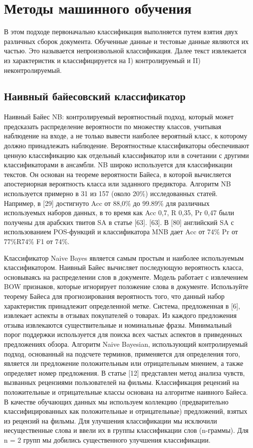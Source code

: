 \section{Методы машинного обучения}

В этом подходе первоначально классификация выполняется путем взятия двух
различных сборок документа. Обученные данные и тестовые данные являются их
частью. Это называется непроизвольной классификация. Далее текст извлекается из
характеристик и классифицируется на I) контролируемый и II) неконтролируемый.
\cite{article18}

\subsection{Наивный байесовский классификатор}

Наивный Байес NB: контролируемый вероятностный подход, который может предсказать
распределение вероятности по множеству классов, учитывая наблюдение на входе, а
не только вывести наиболее вероятный класс, к которому должно принадлежать
наблюдение. Вероятностные классификаторы обеспечивают ценную классификацию как
отдельный классификатор или в сочетании с другими классификаторами в ансамбли.
NB широко используется для классификации текстов. Он основан на теореме
вероятности Байеса, в которой вычисляется апостериорная вероятность класса или
заданного предиктора.  Алгоритм NB используется примерно в 31 из 157 (около
20\%) исследованных статей. Например, в [29] достигнуто Acc от 88,0\% до 99.89\%
для различных используемых наборов данных, в то время как Acc 0,7, R 0,35, Pr
0,47 были получены для арабских твитов SA в статье [63]. [63]. В [80] английский
SA с использованием POS-функций и классификатора MNB дает Acc от 74\% Pr от
77\%R74\% F1 от 74\%.~\cite{article2}

Классификатор Naive Bayes является самым простым и наиболее используемым
классификатором. Наивный Байес вычисляет последующую вероятность класса,
основываясь на распределении слов в документе. Модель работает с извлечением BOW
признаков, которые игнорирует положение слова в документе. Используйте теорему
Байеса для прогнозирования вероятность того, что данный набор характеристик
принадлежит определенной метке.
Система, предложенная в [6], извлекает аспекты в отзывах покупателей о товарах.
Из каждого предложения отзыва извлекаются существительные и номинальные фразы.
Минимальный порог поддержки используется для поиска всех частых аспектов в
приведенных предложениях обзора. Алгоритм Naive Bayesian, использующий
контролируемый подход, основанный на подсчете терминов, применяется для
определения того, является ли предложение положительным или отрицательным
мнением, а также определяет номер предложения. В статье [12] представлен метод
анализа чувств, вызванных рецензиями пользователей на фильмы. Классификация
рецензий на положительные и отрицательные классы основана на алгоритме наивного
Байеса. В качестве обучающих данных мы используем коллекцию (предварительно
классифицированных как положительные и отрицательные) предложений, взятых из
рецензий на фильмы. Для улучшения классификации мы исключили несущественные
слова и ввели их в группы классификации слов (n-граммы). Для n = 2 групп мы
добились существенного улучшения классификации.~\cite{article4}

